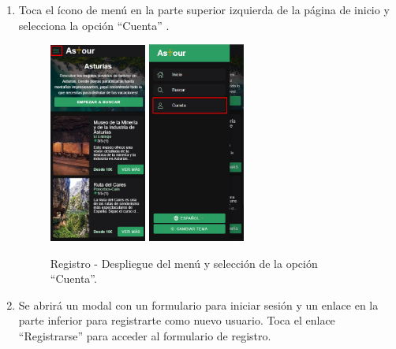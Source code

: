 \begin{enumerate}
	\item Toca el ícono de menú en la parte superior izquierda de la página de inicio y selecciona la opción “Cuenta” .
	      \begin{figure}[H]
		      \centering
		      \includegraphics[width=0.3\textwidth]{7-Construccion/Manuales/mobile/menu marcado.png}
		      \includegraphics[width=0.3\textwidth]{7-Construccion/Manuales/mobile/cuenta marcado.png}
		      \caption{Registro - Despliegue del menú y selección de la opción “Cuenta”.}
	      \end{figure}
	\item Se abrirá un modal con un formulario para iniciar sesión y un enlace en la parte inferior para registrarte como nuevo usuario. Toca el enlace “Registrarse” para acceder al formulario de registro.
	      \begin{figure}[H]
		      \centering

\end{figure}
\end{enumerate}
